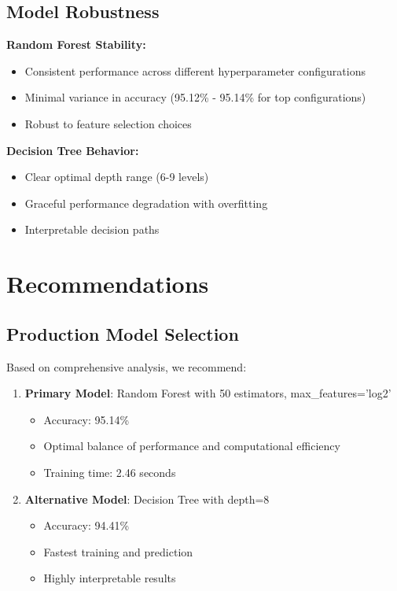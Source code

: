 \documentclass[12pt,a4paper]{article}
\begin{document}
\subsection{Model Robustness}

\textbf{Random Forest Stability:}
\begin{itemize}
    \item Consistent performance across different hyperparameter configurations
    \item Minimal variance in accuracy (95.12\% - 95.14\% for top configurations)
    \item Robust to feature selection choices
\end{itemize}

\textbf{Decision Tree Behavior:}
\begin{itemize}
    \item Clear optimal depth range (6-9 levels)
    \item Graceful performance degradation with overfitting
    \item Interpretable decision paths
\end{itemize}

\section{Recommendations}

\subsection{Production Model Selection}

Based on comprehensive analysis, we recommend:

\begin{enumerate}
    \item \textbf{Primary Model}: Random Forest with 50 estimators, max\_features='log2'
    \begin{itemize}
        \item Accuracy: 95.14\%
        \item Optimal balance of performance and computational efficiency
        \item Training time: 2.46 seconds
    \end{itemize}

    \item \textbf{Alternative Model}: Decision Tree with depth=8
    \begin{itemize}
        \item Accuracy: 94.41\%
        \item Fastest training and prediction
        \item Highly interpretable results
    \end{itemize}
\end{enumerate}
\end{document}
